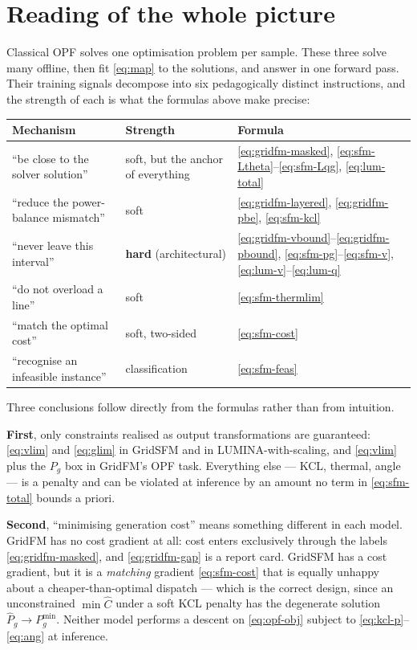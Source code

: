 \documentclass[11pt]{article}
\newcommand{\pred}[1]{\widehat{#1}}
\begin{document}
\section{Reading of the whole picture}

Classical OPF solves one optimisation problem per sample. These three solve many offline,
then fit \eqref{eq:map} to the solutions, and answer in one forward pass. Their training
signals decompose into six pedagogically distinct instructions, and the strength of each is
what the formulas above make precise:
\begin{center}
\renewcommand{\arraystretch}{1.2}
\begin{tabular}{@{}p{}p{}p{}@{}}
\toprule
Mechanism & Strength & Formula \\
\midrule
``be close to the solver solution'' & soft, but the anchor of everything
  & \eqref{eq:gridfm-masked}, \eqref{eq:sfm-Ltheta}--\eqref{eq:sfm-Lqg}, \eqref{eq:lum-total} \\
``reduce the power-balance mismatch'' & soft
  & \eqref{eq:gridfm-layered}, \eqref{eq:gridfm-pbe}, \eqref{eq:sfm-kcl} \\
``never leave this interval'' & \textbf{hard} (architectural)
  & \eqref{eq:gridfm-vbound}--\eqref{eq:gridfm-pbound}, \eqref{eq:sfm-pg}--\eqref{eq:sfm-v}, \eqref{eq:lum-v}--\eqref{eq:lum-q} \\
``do not overload a line'' & soft
  & \eqref{eq:sfm-thermlim} \\
``match the optimal cost'' & soft, two-sided
  & \eqref{eq:sfm-cost} \\
``recognise an infeasible instance'' & classification
  & \eqref{eq:sfm-feas} \\
\bottomrule
\end{tabular}
\end{center}

Three conclusions follow directly from the formulas rather than from intuition.

\textbf{First}, only constraints realised as output transformations are guaranteed:
\eqref{eq:vlim} and \eqref{eq:glim} in GridSFM and in LUMINA-with-scaling, and
\eqref{eq:vlim} plus the $P_g$ box in GridFM's OPF task. Everything else --- KCL, thermal,
angle --- is a penalty and can be violated at inference by an amount no term in
\eqref{eq:sfm-total} bounds a priori.

\textbf{Second}, ``minimising generation cost'' means something different in each model.
GridFM has no cost gradient at all: cost enters exclusively through the labels
\eqref{eq:gridfm-masked}, and \eqref{eq:gridfm-gap} is a report card. GridSFM has a cost
gradient, but it is a \emph{matching} gradient \eqref{eq:sfm-cost} that is equally unhappy
about a cheaper-than-optimal dispatch --- which is the correct design, since an
unconstrained $\min\pred{C}$ under a soft KCL penalty has the degenerate solution
$\pred{P}_g\to P^{\min}_g$. Neither model performs a descent on \eqref{eq:opf-obj} subject
to \eqref{eq:kcl-p}--\eqref{eq:ang} at inference.
\end{document}
